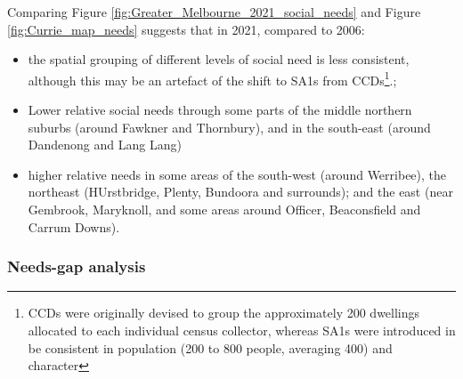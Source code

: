 \documentclass[preprint, 3p,
authoryear]{elsarticle} %
\providecommand{\tightlist}{%
  \setlength{\itemsep}{0pt}\setlength{\parskip}{0pt}}
\begin{document}
Comparing Figure \ref{fig:Greater_Melbourne_2021_social_needs} and
Figure \ref{fig:Currie_map_needs} suggests that in 2021, compared to
2006:

\begin{itemize}
\tightlist
\item
  the spatial grouping of different levels of social need is less
  consistent, although this may be an artefact of the shift to SA1s from
  CCDs\footnote{CCDs were originally devised to group the approximately
    200 dwellings allocated to each individual census collector, whereas
    SA1s were introduced in be consistent in population (200 to 800
    people, averaging 400) and character\citep{ABS_SA1s_CCDs}}.;
\item
  Lower relative social needs through some parts of the middle northern
  suburbs (around Fawkner and Thornbury), and in the south-east (around
  Dandenong and Lang Lang)
\item
  higher relative needs in some areas of the south-west (around
  Werribee), the northeast (HUrstbridge, Plenty, Bundoora and
  surrounds); and the east (near Gembrook, Maryknoll, and some areas
  around Officer, Beaconsfield and Carrum Downs).
\end{itemize}

\subsubsection{Needs-gap analysis}\label{needs-gap-analysis}
\end{document}
